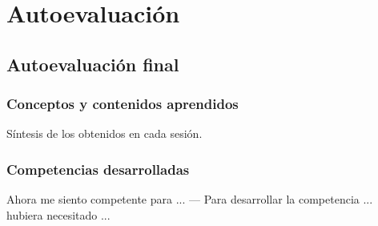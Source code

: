 \chapter{Autoevaluación}\label{cap:autoevaluacion}

\section{Autoevaluación final}

\subsection{Conceptos y contenidos aprendidos}
Síntesis de los obtenidos en cada sesión.

\subsection{Competencias desarrolladas}
Ahora me siento competente para ... --- Para desarrollar la competencia ... hubiera necesitado ...
